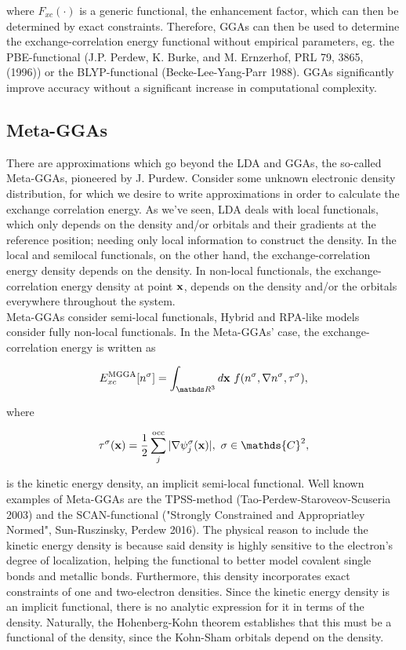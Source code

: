 \documentclass{homework}
\begin{document}
where $F_{xc}(\cdot)$ is a generic functional, the enhancement factor, which can then be determined by exact constraints. Therefore, GGAs can then be used to determine the exchange-correlation energy functional without empirical parameters, eg. the PBE-functional (J.P. Perdew, K. Burke, and M. Ernzerhof, PRL 79, 3865, (1996)) or the BLYP-functional (Becke-Lee-Yang-Parr 1988). GGAs significantly improve accuracy without a significant increase in computational complexity. \\

\subsection{Meta-GGAs}

There are approximations which go beyond the LDA and GGAs, the so-called Meta-GGAs, pioneered by J. Purdew. Consider some unknown electronic density distribution, for which we desire to write approximations in order to calculate the exchange correlation energy. As we've seen, LDA deals with local functionals, which only depends on the density and/or orbitals and their gradients at the reference position; needing only local information to construct the density. In the local and semilocal functionals, on the other hand, the exchange-correlation energy density depends on the density. In non-local functionals, the exchange-correlation energy density at point ${\bf x}$, depends on the density and/or the orbitals everywhere throughout the system. \\

Meta-GGAs consider semi-local functionals, Hybrid and RPA-like models consider fully non-local functionals. In the Meta-GGAs' case, the exchange-correlation energy is written as 

\begin{equation}
    E_{xc}^{\textnormal{MGGA}}[n^\sigma] = \int_{\R^3} d\x \blanky f(n^\sigma, \nabla n^\sigma, \tau^\sigma),
\end{equation}

where

$$\tau^\sigma(\x) = \frac{1}{2} \sum_{j}^{\textnormal{occ}} |\nabla\psi_j^\sigma (\x)|, \blanky \sigma \in \mathds{C}^2,$$

is the kinetic energy density, an implicit semi-local functional. Well known examples of Meta-GGAs are the TPSS-method (Tao-Perdew-Staroveov-Scuseria 2003) and the SCAN-functional ("Strongly Constrained and Appropriatley Normed", Sun-Ruszinsky, Perdew 2016). The physical reason to include the kinetic energy density is because said density is highly sensitive to the electron's degree of localization, helping the functional to better model covalent single bonds and metallic bonds. Furthermore, this density incorporates exact constraints of one and two-electron densities. Since the kinetic energy density is an implicit functional, there is no analytic expression for it in terms of the density. Naturally, the Hohenberg-Kohn theorem establishes that this must be a functional of the density, since the Kohn-Sham orbitals depend on the density. \\
\end{document}
